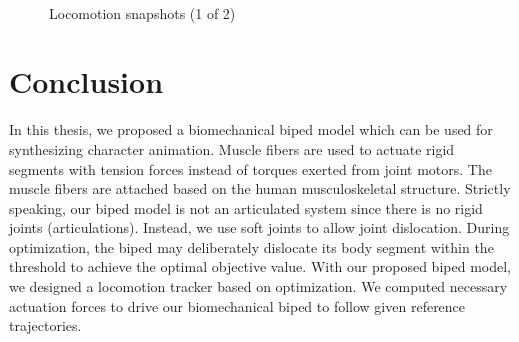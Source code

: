 \documentclass[master,english,final]{kaist-ucs}
\begin{document}
\begin{figure}
  \\
  \caption{Locomotion snapshots (1 of 2)}
  \label{fig:snapshot2}
\end{figure}




\chapter{Conclusion}
In this thesis, we proposed a biomechanical biped model
which can be used for synthesizing character animation.
Muscle fibers are used to actuate rigid segments
with tension forces instead of torques exerted from joint motors.
The muscle fibers are attached based on the human
musculoskeletal structure.
Strictly speaking, our biped model is not an articulated system
since there is no rigid joints (articulations). Instead,
we use soft joints to allow joint dislocation.
During optimization, the biped may deliberately
dislocate its body segment within the threshold to achieve
the optimal objective value.
With our proposed biped model, we designed a locomotion tracker
based on optimization.
We computed necessary actuation forces to drive our biomechanical
biped to follow given reference trajectories.
\end{document}
